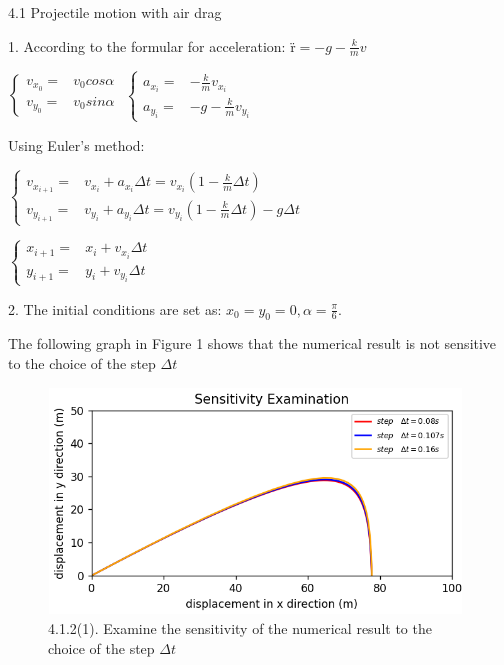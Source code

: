 \documentclass{book}
\begin{document}
{\huge 4.1 Projectile motion with air drag}

{\Large 1.}
\vspace{0.01\textheight}
According to the formular for acceleration:
{\"r}$=-g-\frac{k}{m}v$

$\begin{cases}
    v_{x_{0}}= & v_{0}cos\alpha \\

    v_{y_{0}}= & v_{0}sin\alpha
  \end{cases}$
\quad $
  \begin{cases}
    a_{x_{i}}= & -\frac{k}{m}v_{x_{i}}   \\

    a_{y_{i}}= & -g-\frac{k}{m}v_{y_{i}}
  \end{cases}
$

\vspace{0.01\textheight}
Using Euler's method:
\vspace{0.01\textheight}

\quad $
  \begin{cases}
    v_{x_{i+1}}= & v_{x_{i}}+a_{x_{i}}\Delta t = v_{x_{i}}(1-\frac{k}{m}\Delta t)           \\

    v_{y_{i+1}}= & v_{y_{i}}+a_{y_{i}}\Delta t = v_{y_{i}}(1-\frac{k}{m}\Delta t)-g\Delta t
  \end{cases}
$

\vspace{0.01\textheight}

\quad $
  \begin{cases}
    x_{i+1}= & x_{i}+v_{x_{i}}\Delta t \\

    y_{i+1}= & y_{i}+v_{y_{i}}\Delta t
  \end{cases}
$

\vspace{0.01\textheight}
{\Large 2.}
The initial conditions are set as: $x_{0}=y_{0}=0, \alpha =\frac{\pi}{6}$.

The following graph in Figure 1 shows that the numerical result is not sensitive to the choice of the step {$\Delta t$}

\begin{figure}[H]
  \centering
  \includegraphics[width=11cm,height=6cm]{project4.1.2(4).png}
  \caption{4.1.2(1). Examine the sensitivity of the numerical result to the choice of the step $\Delta t$}
\end{figure}
\end{document}
